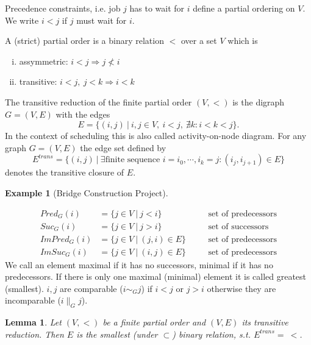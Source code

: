 \documentclass[11pt,a4paper,notitlepage]{article}
\theoremstyle{plain}
\newtheorem{lemma}[defn]{Lemma}
\theoremstyle{definition}
\newtheorem{example}[defn]{Example}
\begin{document}
Precedence constraints, i.e. job $j$ has to wait for $i$ define a partial
ordering on $V$. We write $i<j$ if $j$ must wait for $i$.

\begin{defn}
  A (strict) partial order is a binary relation $<$ over a set $V$ which is
  \begin{enumerate}[(i)]
    \item assymmetric: $i<j \Rightarrow j \not < i$
    \item transitive: $i<j,\ j<k \Rightarrow i < k$
  \end{enumerate}
\end{defn}

\begin{defn}
  The transitive reduction of the finite partial order $(V,<)$ is the digraph
  $G = (V,E)$ with the edges
  \[ E = \{(i,j)\ |\ i,j\in V,\ i<j,\ \nexists k: i < k < j\}. \]
  In the context of scheduling this is also called activity-on-node diagram.
  For any graph $G = (V,E)$ the edge set defined by
  \[ E^{trans} = \{(i,j)\ |\ \exists \text{finite sequence } i=i_{0},\cdots,i_{k} = j: (i_{j}, i_{j+1})\in E\}\]
  denotes the transitive closure of $E$.
\end{defn}

\begin{example}[Bridge Construction Project]
\end{example}

\begin{defn}
  \begin{align*}
    Pred_{G}(i) &= \{j\in V \ |\ j < i\}\quad &&\text{set of predecessors}\\
    Suc_{G}(i) &= \{j\in V \ |\ j > i\}\quad &&\text{set of successors}\\
    ImPred_{G}(i) &= \{j\in V \ |\ (j,i)\in E\}\quad &&\text{set of predecessors}\\
    ImSuc_{G}(i) &= \{j\in V \ |\ (i,j)\in E\}\quad &&\text{set of predecessors}
  \end{align*}
  We call an element maximal if it has no successors, minimal if it has no
  predecessors. If there is only one maximal (minimal) element it is called
  greatest (smallest). $i,j$ are comparable ($i \sim_{G} j$) if $i<j$ or $j>i$
  otherwise they are incomparable ($i\parallel_{G} j$).
\end{defn}

\begin{lemma}
  \label{lemma:gen_rel}
  Let $(V,<)$ be a finite partial order and $(V,E)$ its transitive reduction.
  Then $E$ is the smallest (under $\subset$) binary relation, s.t.
  $E^{trans} =\ <$.
\end{lemma}
\end{document}
